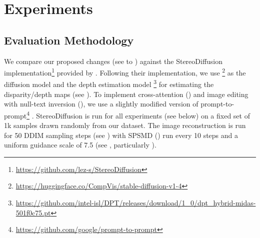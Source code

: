 \section{Experiments}\label{experiments}
\subsection{Evaluation Methodology}\label{eval-method}
We compare our proposed changes (see  to ) against the StereoDiffusion implementation\footnote{\url{https://github.com/lez-s/StereoDiffusion}} provided by \cite{Wang-2024-stereodiffusion}. Following their implementation, we use \footnote{\url{https://huggingface.co/CompVis/stable-diffusion-v1-4}} \citep{rombach2022highresolutionimagesynthesislatent} as the diffusion model and the depth estimation model \footnote{\url{https://github.com/intel-isl/DPT/releases/download/1_0/dpt_hybrid-midas-501f0c75.pt}} \citep{ranftl2021visiontransformersdenseprediction,ranftl2020midas} for estimating the disparity/depth maps (see ). To implement cross-attention () and image editing with null-text inversion (), we use a slightly modified version of prompt-to-prompt\footnote{\url{https://github.com/google/prompt-to-prompt}} \citep{hertz2022prompt,mokady2023null}. StereoDiffusion is run for all experiments (see below) on a fixed set of 1k samples drawn randomly from our dataset. The image reconstruction is run for 50 DDIM sampling steps (see \cite{song2020denoising}) with SPSMD () run every 10 steps and a uniform guidance scale of 7.5 (see , particularly ). 

